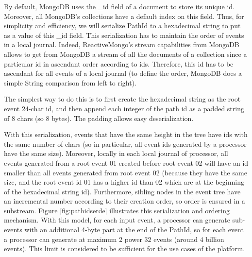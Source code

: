 By default, MongoDB uses the \_id field of a document to store its unique id. Moreover, all MongoDB's collections have a default index on this field. Thus,
for simplicity and efficiency, we will serialize PathId to a hexadecimal string to put as a value of this \_id field. This serialization has to maintain the order
of events in a local journal. Indeed, ReactiveMongo's stream capabilities from MongoDB allows to get from MongoDB a stream of all the documents of a collection since a particular id in ascendant order according to ids. Therefore, this id has to be ascendant for all events of a local journal (to define the order, MongoDB does a simple String comparison from left to right).

The simplest way to do this is to first create the hexadecimal string as the root event 24-char id, and then append each integer of the path id as a padded string of 8 chars (so 8 bytes). The padding allows easy deserialization.

With this serialization, events that have the same height in the tree have ids with the same number of chars (so in particular, all event ids generated by a processor have the same size). Moreover, locally in each local journal of processor, all events generated from a root event 01 created before root event 02 will have an id smaller than all events
generated from root event 02 (because they have the same size, and the root event id 01 has a higher id than 02 which are at the beginning of the hexadecimal string id). Furthermore,
sibling nodes in the event tree have an incremental number according to their creation order, so order is ensured in a substream. Figure \ref{fig:pathidserde} illustrates this serialization and ordering mechanism. With this model, for each input event, a processor can generate sub-events with an additional 4-byte part at the end of the PathId, so
for each event a processor can generate at maximum 2 power 32 events (around 4 billion events). This limit is considered to be sufficient for the use cases of the platform.


